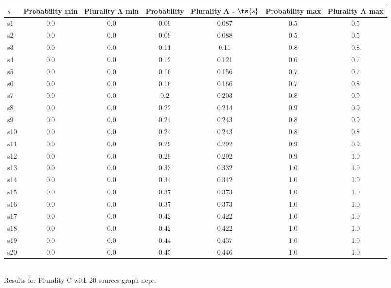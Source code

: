 \documentclass{article}
\begin{document}
\noindent\begin{tabular}{|l|c|c|c|c|c|c|}
\hline
$s$& Probability min & Plurality A min & Probability & Plurality A - $\ts{s}$ & Probability max & Plurality A max\\
\hline
s1 &0.0 & 0.0 & 0.09 & 0.087 & 0.5 & 0.5\\
\hline
s2 &0.0 & 0.0 & 0.09 & 0.088 & 0.5 & 0.5\\
\hline
s3 &0.0 & 0.0 & 0.11 & 0.11 & 0.8 & 0.8\\
\hline
s4 &0.0 & 0.0 & 0.12 & 0.121 & 0.6 & 0.7\\
\hline
s5 &0.0 & 0.0 & 0.16 & 0.156 & 0.7 & 0.7\\
\hline
s6 &0.0 & 0.0 & 0.16 & 0.166 & 0.7 & 0.8\\
\hline
s7 &0.0 & 0.0 & 0.2 & 0.203 & 0.8 & 0.9\\
\hline
s8 &0.0 & 0.0 & 0.22 & 0.214 & 0.9 & 0.9\\
\hline
s9 &0.0 & 0.0 & 0.24 & 0.243 & 0.8 & 0.9\\
\hline
s10 &0.0 & 0.0 & 0.24 & 0.243 & 0.8 & 0.8\\
\hline
s11 &0.0 & 0.0 & 0.29 & 0.292 & 0.9 & 0.9\\
\hline
s12 &0.0 & 0.0 & 0.29 & 0.292 & 0.9 & 1.0\\
\hline
s13 &0.0 & 0.0 & 0.33 & 0.332 & 1.0 & 1.0\\
\hline
s14 &0.0 & 0.0 & 0.34 & 0.342 & 1.0 & 1.0\\
\hline
s15 &0.0 & 0.0 & 0.37 & 0.373 & 1.0 & 1.0\\
\hline
s16 &0.0 & 0.0 & 0.37 & 0.373 & 1.0 & 1.0\\
\hline
s17 &0.0 & 0.0 & 0.42 & 0.422 & 1.0 & 1.0\\
\hline
s18 &0.0 & 0.0 & 0.42 & 0.422 & 1.0 & 1.0\\
\hline
s19 &0.0 & 0.0 & 0.44 & 0.437 & 1.0 & 1.0\\
\hline
s20 &0.0 & 0.0 & 0.45 & 0.446 & 1.0 & 1.0\\
\hline
\end{tabular}\\

\noindent Results for Plurality C with 20 sources graph ncpr.
\end{document}
